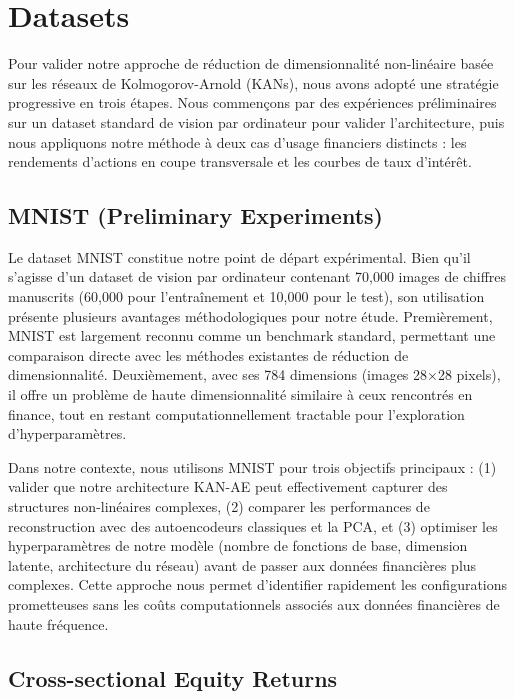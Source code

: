 \section{Datasets}

Pour valider notre approche de réduction de dimensionnalité non-linéaire basée sur les réseaux de Kolmogorov-Arnold (KANs), nous avons adopté une stratégie progressive en trois étapes. Nous commençons par des expériences préliminaires sur un dataset standard de vision par ordinateur pour valider l'architecture, puis nous appliquons notre méthode à deux cas d'usage financiers distincts : les rendements d'actions en coupe transversale et les courbes de taux d'intérêt.

\subsection{MNIST (Preliminary Experiments)}

Le dataset MNIST constitue notre point de départ expérimental. Bien qu'il s'agisse d'un dataset de vision par ordinateur contenant 70,000 images de chiffres manuscrits (60,000 pour l'entraînement et 10,000 pour le test), son utilisation présente plusieurs avantages méthodologiques pour notre étude. Premièrement, MNIST est largement reconnu comme un benchmark standard, permettant une comparaison directe avec les méthodes existantes de réduction de dimensionnalité. Deuxièmement, avec ses 784 dimensions (images 28×28 pixels), il offre un problème de haute dimensionnalité similaire à ceux rencontrés en finance, tout en restant computationnellement tractable pour l'exploration d'hyperparamètres.

Dans notre contexte, nous utilisons MNIST pour trois objectifs principaux : (1) valider que notre architecture KAN-AE peut effectivement capturer des structures non-linéaires complexes, (2) comparer les performances de reconstruction avec des autoencodeurs classiques et la PCA, et (3) optimiser les hyperparamètres de notre modèle (nombre de fonctions de base, dimension latente, architecture du réseau) avant de passer aux données financières plus complexes. Cette approche nous permet d'identifier rapidement les configurations prometteuses sans les coûts computationnels associés aux données financières de haute fréquence.

\subsection{Cross-sectional Equity Returns}

